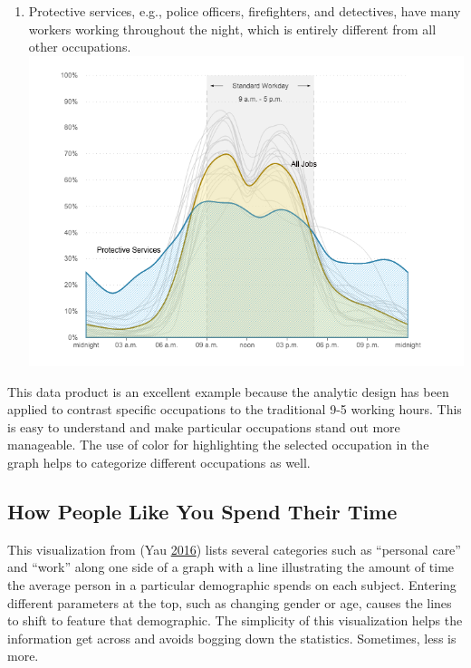 \documentclass[]{book}
\providecommand{\tightlist}{%
  \setlength{\itemsep}{0pt}\setlength{\parskip}{0pt}}
\begin{document}
\begin{enumerate}
\def\labelenumi{\arabic{enumi}.}
\setcounter{enumi}{2}
\tightlist
\item
  Protective services, e.g., police officers, firefighters, and
  detectives, have many workers working throughout the night, which is
  entirely different from all other occupations.
  \includegraphics{images/protective.png}
\end{enumerate}

This data product is an excellent example because the analytic design
has been applied to contrast specific occupations to the traditional 9-5
working hours. This is easy to understand and make particular
occupations stand out more manageable. The use of color for highlighting
the selected occupation in the graph helps to categorize different
occupations as well.

\subsection{How People Like You Spend Their
Time}\label{how-people-like-you-spend-their-time}

This visualization from (Yau \protect\hyperlink{ref-spendingtime}{2016})
lists several categories such as ``personal care'' and ``work'' along
one side of a graph with a line illustrating the amount of time the
average person in a particular demographic spends on each subject.
Entering different parameters at the top, such as changing gender or
age, causes the lines to shift to feature that demographic. The
simplicity of this visualization helps the information get across and
avoids bogging down the statistics. Sometimes, less is more.
\end{document}
